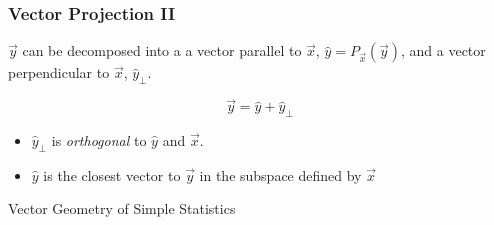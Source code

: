 \documentclass{beamer}
\begin{document}
\begin{frame}
  \frametitle{Vector Projection II}

$\vec{y}$ can be decomposed into a a vector parallel to $\vec{x}$, $\widehat{y} = P_{\vec{x}}(\vec{y})$, and a vector perpendicular to $\vec{x}$, $\widehat{y}_{\bot}$.

\[
\vec{y} = \widehat{y} + \widehat{y}_{\bot}
\]

\begin{center}

\end{center}

\begin{itemize}
 \item $\widehat{y}_{\bot}$ is \emph{orthogonal} to $\widehat{y}$ and $\vec{x}$.
 \item $\widehat{y}$  is the closest vector to $\vec{y}$ in the subspace defined by $\vec{x}$
\end{itemize}

\end{frame}

\begin{frame}

\begin{center}
\LARGE{Vector Geometry of Simple Statistics}
\end{center}


\end{frame}
\end{document}

